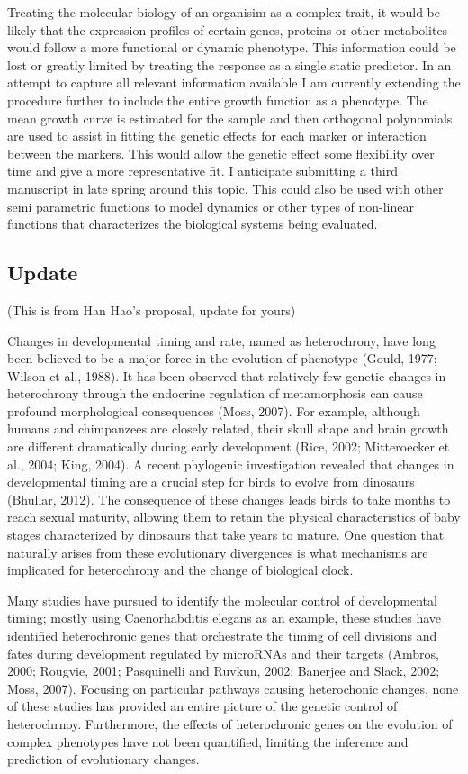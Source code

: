 \documentclass[]{book}
\theoremstyle{definition}
\theoremstyle{definition}
\theoremstyle{remark}
\begin{document}
Treating the molecular biology of an organisim as a complex trait, it
would be likely that the expression profiles of certain genes, proteins
or other metabolites would follow a more functional or dynamic
phenotype. This information could be lost or greatly limited by treating
the response as a single static predictor. In an attempt to capture all
relevant information available I am currently extending the procedure
further to include the entire growth function as a phenotype. The mean
growth curve is estimated for the sample and then orthogonal polynomials
are used to assist in fitting the genetic effects for each marker or
interaction between the markers. This would allow the genetic effect
some flexibility over time and give a more representative fit. I
anticipate submitting a third manuscript in late spring around this
topic. This could also be used with other semi parametric functions to
model dynamics or other types of non-linear functions that characterizes
the biological systems being evaluated.

\subsection{Update}\label{update}

(This is from Han Hao's proposal, update for yours)

Changes in developmental timing and rate, named as heterochrony, have
long been believed to be a major force in the evolution of phenotype
(Gould, 1977; Wilson et al., 1988). It has been observed that relatively
few genetic changes in heterochrony through the endocrine regulation of
metamorphosis can cause profound morphological consequences (Moss,
2007). For example, although humans and chimpanzees are closely related,
their skull shape and brain growth are different dramatically during
early development (Rice, 2002; Mitteroecker et al., 2004; King, 2004). A
recent phylogenic investigation revealed that changes in developmental
timing are a crucial step for birds to evolve from dinosaurs (Bhullar,
2012). The consequence of these changes leads birds to take months to
reach sexual maturity, allowing them to retain the physical
characteristics of baby stages characterized by dinosaurs that take
years to mature. One question that naturally arises from these
evolutionary divergences is what mechanisms are implicated for
heterochrony and the change of biological clock.

Many studies have pursued to identify the molecular control of
developmental timing; mostly using Caenorhabditis elegans as an example,
these studies have identified heterochronic genes that orchestrate the
timing of cell divisions and fates during development regulated by
microRNAs and their targets (Ambros, 2000; Rougvie, 2001; Pasquinelli
and Ruvkun, 2002; Banerjee and Slack, 2002; Moss, 2007). Focusing on
particular pathways causing heterochonic changes, none of these studies
has provided an entire picture of the genetic control of heterochrnoy.
Furthermore, the effects of heterochronic genes on the evolution of
complex phenotypes have not been quantified, limiting the inference and
prediction of evolutionary changes.
\end{document}
